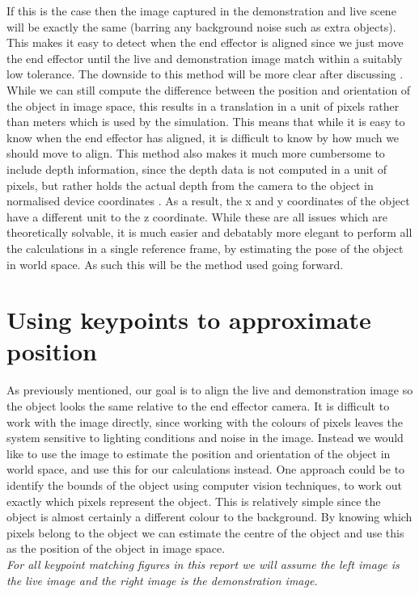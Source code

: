 If this is the case then the image captured in the demonstration and live scene will be exactly the same (barring any background noise such as extra objects). This makes it easy to detect when the end effector is aligned since we just move the end effector until the live and demonstration image match within a suitably low tolerance. The downside to this method will be more clear after discussing . While we can still compute the difference between the position and orientation of the object in image space, this results in a translation in a unit of pixels rather than meters which is used by the simulation. This means that while it is easy to know when the end effector has aligned, it is difficult to know by how much we should move to align. This method also makes it much more cumbersome to include depth information, since the depth data is not computed in a unit of pixels, but rather holds the actual depth from the camera to the object in normalised device coordinates \cite{ndc}. As a result, the x and y coordinates of the object have a different unit to the z coordinate. While these are all issues which are theoretically solvable, it is much easier and debatably more elegant to perform all the calculations in a single reference frame, by estimating the pose of the object in world space. As such this will be the method used going forward.


\section{Using keypoints to approximate position}
\label{sec:keypoints}
As previously mentioned, our goal is to align the live and demonstration image so the object looks the same relative to the end effector camera. It is difficult to work with the image directly, since working with the colours of pixels leaves the system sensitive to lighting conditions and noise in the image. Instead we would like to use the image to estimate the position and orientation of the object in world space, and use this for our calculations instead. One approach could be to identify the bounds of the object using computer vision techniques, to work out exactly which pixels represent the object. This is relatively simple since the object is almost certainly a different colour to the background. By knowing which pixels belong to the object we can estimate the centre of the object and use this as the position of the object in image space.\\

\textit{For all keypoint matching figures in this report we will assume the left image is the live image and the right image is the demonstration image.}\\

